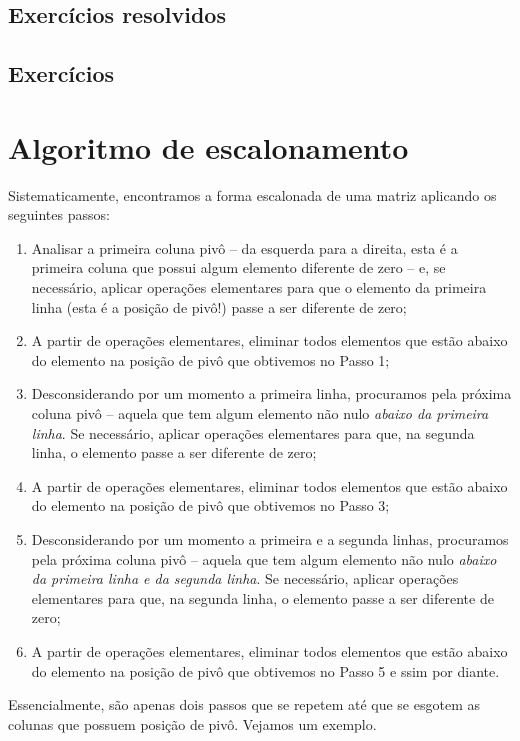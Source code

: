 \documentclass[../livro.tex]{subfiles} %
\begin{document}
\subsection*{Exercícios resolvidos}

\construirExeresol

\subsection*{Exercícios}

\construirExer


\section{Algoritmo de escalonamento}

Sistematicamente, encontramos a forma escalonada de uma matriz aplicando os seguintes passos:
\begin{enumerate}
  \item Analisar a primeira coluna pivô -- da esquerda para a direita, esta é a primeira coluna que possui algum elemento diferente de zero -- e, se necessário, aplicar operações elementares para que o elemento da primeira linha (esta é a posição de pivô!) passe a ser diferente de zero;
  \item A partir de operações elementares, eliminar todos elementos que estão abaixo do elemento na posição de pivô que obtivemos no Passo 1;
  \item Desconsiderando por um momento a primeira linha, procuramos pela próxima coluna pivô -- aquela que tem algum elemento não nulo \textit{abaixo da primeira linha}. Se necessário, aplicar operações elementares para que, na segunda linha, o elemento passe a ser diferente de zero;
  \item A partir de operações elementares, eliminar todos elementos que estão abaixo do elemento na posição de pivô que obtivemos no Passo 3;
  \item Desconsiderando por um momento a primeira e a segunda linhas, procuramos pela próxima coluna pivô -- aquela que tem algum elemento não nulo \textit{abaixo da primeira linha e da segunda linha}. Se necessário, aplicar operações elementares para que, na segunda linha, o elemento passe a ser diferente de zero;
  \item A partir de operações elementares, eliminar todos elementos que estão abaixo do elemento na posição de pivô que obtivemos no Passo 5 e ssim por diante.
\end{enumerate} Essencialmente, são apenas dois passos que se repetem até que se esgotem as colunas que possuem posição de pivô. Vejamos um exemplo.
\end{document}
